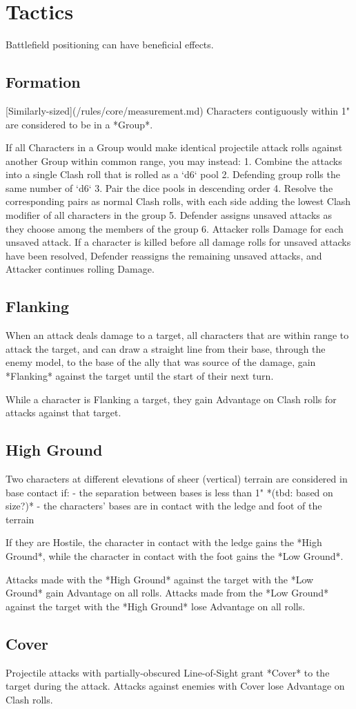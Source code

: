 \section{Tactics}
Battlefield positioning can have beneficial effects.
\subsection{Formation}
[Similarly-sized](/rules/core/measurement.md) Characters contiguously within 1" are considered to be in a *Group*.

If all Characters in a Group would make identical projectile attack rolls 
against another Group within common range, you may instead:
1. Combine the attacks into a single Clash roll that is rolled as a `d6` pool
2. Defending group rolls the same number of `d6`
3. Pair the dice pools in descending order
4. Resolve the corresponding pairs as normal Clash rolls, 
with each side adding the lowest Clash modifier of all characters in the group
5. Defender assigns unsaved attacks as they choose among the members of the group
6. Attacker rolls Damage for each unsaved attack. 
If a character is killed before all damage rolls for unsaved attacks have been resolved, 
Defender reassigns the remaining unsaved attacks, and Attacker continues rolling Damage.
\subsection{Flanking}
When an attack deals damage to a target, all characters that are within range to attack the target,
and can draw a straight line from their base, through the enemy model, 
to the base of the ally that was source of the damage, 
gain *Flanking* against the target until the start of their next turn.

While a character is Flanking a target, 
they gain Advantage on Clash rolls for attacks against that target.
\subsection{High Ground}
Two characters at different elevations of sheer (vertical) terrain are considered in base contact if:
- the separation between bases is less than 1" *(tbd: based on size?)*
- the characters' bases are in contact with the ledge and foot of the terrain

If they are Hostile, the character in contact with the ledge gains the *High Ground*,
while the character in contact with the foot gains the *Low Ground*.

Attacks made with the *High Ground* against the target with the *Low Ground* gain Advantage on all rolls.
Attacks made from the *Low Ground* against the target with the *High Ground* lose Advantage on all rolls.
\subsection{Cover}
Projectile attacks with partially-obscured Line-of-Sight grant *Cover* to the target during the attack.
Attacks against enemies with Cover lose Advantage on Clash rolls.

